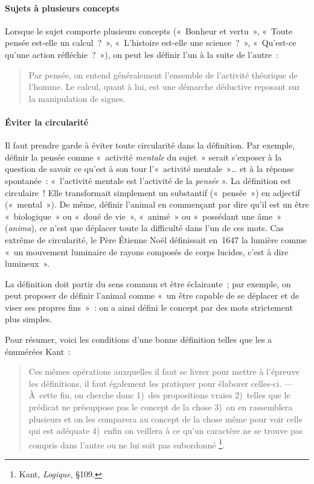 \documentclass[a4paper]{article}
\begin{document}
\paragraph{Sujets à plusieurs concepts}
\label{sec-2-2-1-6}

Lorsque le sujet comporte plusieurs concepts (« Bonheur et vertu », « Toute
pensée est-elle un calcul ? », « L'histoire est-elle une science ? »,
« Qu'est-ce qu'une action réfléchie ? »), on peut les définir l'un à la
suite de l'autre :

\begin{quote}
Par pensée, on entend généralement l'ensemble de l'activité théorique
de l'homme. Le calcul, quant à lui, est une démarche déductive
reposant sur la manipulation de signes.
\end{quote}

\paragraph{Éviter la circularité}
\label{sec-2-2-1-7}

Il faut prendre garde à éviter toute circularité dans la définition. Par
exemple, définir la pensée comme « activité \emph{mentale} du sujet » serait
s'exposer à la question de savoir ce qu'est à son tour l'« activité
mentale »\ldots{} et à la réponse spontanée : « l'activité mentale est
l'activité de la \emph{pensée} ». La définition est circulaire ! Elle
transformait simplement un substantif (« pensée ») en adjectif
(« mental »). De même, définir l'animal en commençant par dire qu'il est
un être « biologique » ou « doué de vie », « animé » ou « possédant une
âme » (\emph{anima}), ce n'est que déplacer toute la difficulté dans l'un de
ces mots. Cas extrême de circularité, le Père Étienne Noël définissait
en 1647 la lumière comme « un mouvement luminaire de rayons composés de
corps lucides, c'est à dire lumineux ».

La définition doit partir du sens commun et être éclairante ; par
exemple, on peut proposer de définir l'animal comme « un être capable de
se déplacer et de viser ses propres fins » : on a ainsi défini le
concept par des mots strictement plus simples.

Pour résumer, voici les conditions d'une bonne définition telles que les
a énumérées Kant :

\begin{quote}
Ces mêmes opérations auxquelles il faut se livrer pour mettre à
l'épreuve les définitions, il faut également les pratiquer pour
élaborer celles-ci. --- À cette fin, on cherche donc 1) des
propositions vraies 2) telles que le prédicat ne présuppose pas le
concept de la chose 3) on en rassemblera plusieurs et on les comparera
au concept de la chose même pour voir celle qui est adéquate 4) enfin
on veillera à ce qu'un caractère ne se trouve pas compris dans l'autre
ou ne lui soit pas subordonné \footnote{Kant, \emph{Logique}, §109.}.
\end{quote}
\end{document}
